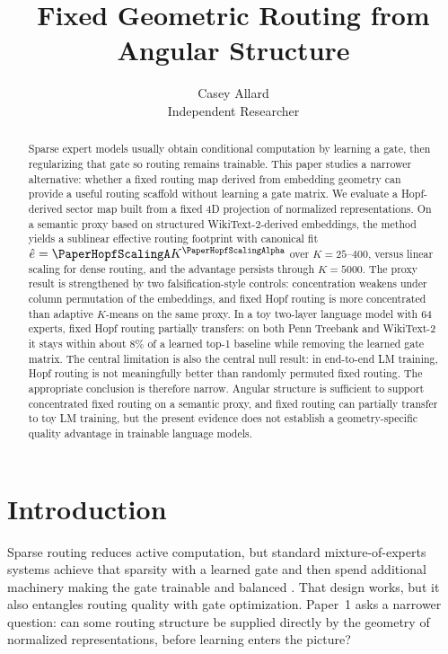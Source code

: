 \documentclass{article}
\title{Fixed Geometric Routing from Angular Structure}
\author{Casey Allard \\
Independent Researcher}
\begin{document}
\maketitle

\begin{abstract}
Sparse expert models usually obtain conditional computation by learning a gate, then regularizing that gate so routing remains trainable. This paper studies a narrower alternative: whether a fixed routing map derived from embedding geometry can provide a useful routing scaffold without learning a gate matrix. We evaluate a Hopf-derived sector map built from a fixed 4D projection of normalized representations. On a semantic proxy based on structured WikiText-2-derived embeddings, the method yields a sublinear effective routing footprint with canonical fit $\hat{e}=\PaperHopfScalingA K^{\PaperHopfScalingAlpha}$ over $K=25$--$400$, versus linear scaling for dense routing, and the advantage persists through $K=5000$. The proxy result is strengthened by two falsification-style controls: concentration weakens under column permutation of the embeddings, and fixed Hopf routing is more concentrated than adaptive $K$-means on the same proxy. In a toy two-layer language model with 64 experts, fixed Hopf routing partially transfers: on both Penn Treebank and WikiText-2 it stays within about $8\%$ of a learned top-1 baseline while removing the learned gate matrix. The central limitation is also the central null result: in end-to-end LM training, Hopf routing is not meaningfully better than randomly permuted fixed routing. The appropriate conclusion is therefore narrow. Angular structure is sufficient to support concentrated fixed routing on a semantic proxy, and fixed routing can partially transfer to toy LM training, but the present evidence does not establish a geometry-specific quality advantage in trainable language models.
\end{abstract}

\section{Introduction}
Sparse routing reduces active computation, but standard mixture-of-experts systems achieve that sparsity with a learned gate and then spend additional machinery making the gate trainable and balanced \citep{shazeer2017outrageously,fedus2022switch}. That design works, but it also entangles routing quality with gate optimization. Paper~1 asks a narrower question: can some routing structure be supplied directly by the geometry of normalized representations, before learning enters the picture?
\end{document}
